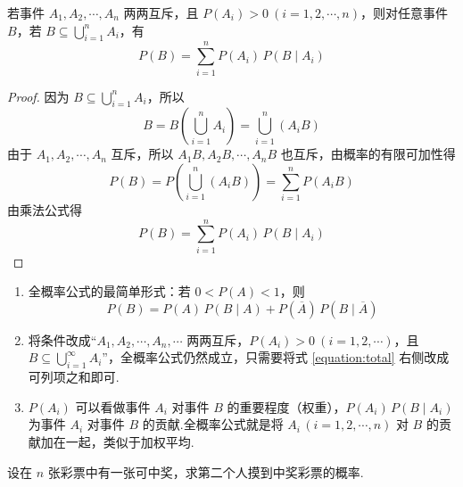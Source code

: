 \begin{theorem}[][全概率公式]
    \indent 若事件 $A_1,A_2,\cdots,A_n$ 两两互斥，且 $P(A_i)>0 \ (i=1,2,\cdots,n)$，则对任意事件 $B$，若 $B \subseteq \displaystyle\bigcup_{i=1}^n A_i$，有
    \begin{equation} \label{equation:total}
        P(B) = \sum_{i=1}^n P(A_i) \, P(B \mid A_i)
    \end{equation}
\end{theorem}

\begin{proof}
    因为 $B \subseteq \displaystyle\bigcup_{i=1}^n A_i$，所以
    $$
    B = B \left( \bigcup_{i=1}^n A_i \right) = \bigcup_{i=1}^n(A_i B)
    $$
    由于 $A_1,A_2,\cdots,A_n$ 互斥，所以 $A_1 B, A_2 B, \cdots, A_n B$ 也互斥，由概率的有限可加性得
    $$
    P(B) = P \left( \bigcup_{i=1}^n (A_i B) \right) = \sum_{i=1}^n P(A_i B)
    $$
    由乘法公式得
    $$
    P(B) = \sum_{i=1}^n P(A_i) \, P(B \mid A_i)
    $$
\end{proof}

\begin{note}
    \begin{enumerate}
        \item 全概率公式的最简单形式：若 $0 < P(A) < 1$，则
        $$
        P(B) = P(A) \, P(B \mid A) + P(\overline{A}) \, P(B \mid \overline{A})
        $$
        \item 将条件改成“$A_1, A_2, \cdots, A_n, \cdots$ 两两互斥，$P(A_i)>0 \ (i=1,2,\cdots)$，且 $B \subseteq \displaystyle\bigcup_{i=1}^{\infty} A_i$”，全概率公式仍然成立，只需要将式 \eqref{equation:total} 右侧改成可列项之和即可.
        \item $P(A_i)$ 可以看做事件 $A_i$ 对事件 $B$ 的重要程度（权重），$P(A_i) \, P(B \mid A_i)$ 为事件 $A_i$ 对事件 $B$ 的贡献.全概率公式就是将 $A_i \, (i=1,2,\cdots,n)$ 对 $B$ 的贡献加在一起，类似于加权平均.
    \end{enumerate}
\end{note}

\begin{example}
    \indent 设在 $n$ 张彩票中有一张可中奖，求第二个人摸到中奖彩票的概率.
\end{example}

